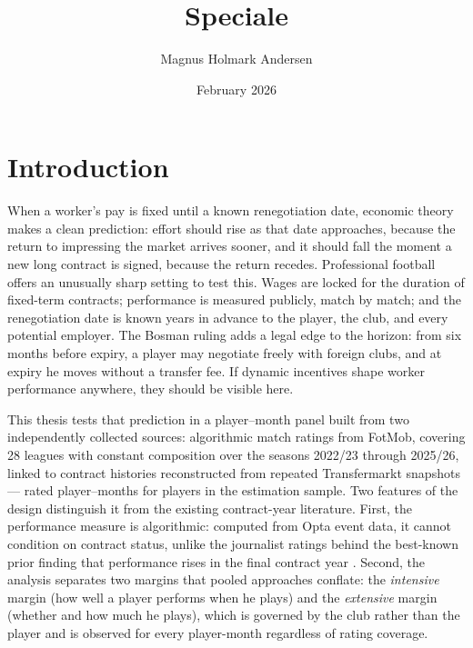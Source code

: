\documentclass{article}
\title{Speciale}
\author{Magnus Holmark Andersen}
\date{February 2026}
\begin{document}
\maketitle

\begin{abstract}
\end{abstract}

\section{Introduction}

When a worker's pay is fixed until a known renegotiation date, economic theory
makes a clean prediction: effort should rise as that date approaches, because
the return to impressing the market arrives sooner, and it should fall the
moment a new long contract is signed, because the return recedes. Professional
football offers an unusually sharp setting to test this. Wages are locked for
the duration of fixed-term contracts; performance is measured publicly, match
by match; and the renegotiation date is known years in advance to the player,
the club, and every potential employer. The Bosman ruling adds a legal edge to
the horizon: from six months before expiry, a player may negotiate freely with
foreign clubs, and at expiry he moves without a transfer fee. If dynamic
incentives shape worker performance anywhere, they should be visible here.

This thesis tests that prediction in a player--month panel built from two
independently collected sources: algorithmic match ratings from FotMob,
covering 28 leagues with constant composition over the seasons 2022/23 through
2025/26, linked to contract histories reconstructed from repeated Transfermarkt
snapshots --- \NStrictObs{} rated player--months for \NStrictPlayers{} players
in the estimation sample. Two features of the design distinguish it from the
existing contract-year literature. First, the performance measure is
algorithmic: computed from Opta event data, it cannot condition on contract
status, unlike the journalist ratings behind the best-known prior finding that
performance rises in the final contract year \citep{frick2011}. Second, the
analysis separates two margins that pooled approaches conflate: the
\emph{intensive} margin (how well a player performs when he plays) and the
\emph{extensive} margin (whether and how much he plays), which is governed by
the club rather than the player and is observed for every player-month
regardless of rating coverage.
\end{document}
